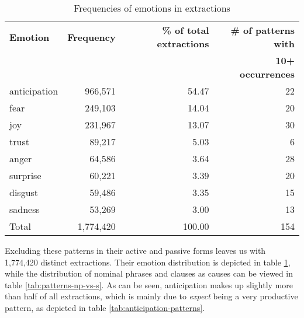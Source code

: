 \begin{table}[h]
\centering
\begin{tabular}{l|r|r|r}
{\bf Emotion} & {\bf Frequency} & {\bf\% of total extractions} & {\bf\# of patterns with}\\
              &                 &                              & {\bf 10+ occurrences}\\\hline
anticipation  & 966,571          & 54.47                       & 22 \\
fear          & 249,103          & 14.04                       & 20 \\
joy           & 231,967          & 13.07                       & 30 \\
trust         & 89,217           & 5.03                        &  6 \\
anger         & 64,586           & 3.64                        & 28 \\
surprise      & 60,221           & 3.39                        & 20 \\
disgust       & 59,486           & 3.35                        & 15 \\
sadness       & 53,269           & 3.00                        & 13\\\hline
Total         & 1,774,420         & 100.00                     & 154                
\end{tabular}
\caption{Frequencies of emotions in extractions}
\label{tab:extraction-emotion-freq}
\end{table}

Excluding these patterns in their active and passive forms leaves us with 1,774,420 distinct extractions. Their emotion distribution is depicted in table \ref{tab:extraction-emotion-freq}, while the distribution of nominal phrases and clauses as causes can be viewed in table \ref{tab:patterns-np-vs-s}. As can be seen, anticipation makes up slightly more than half of all extractions, which is mainly due to \textit{expect} being a very productive pattern, as depicted in table \ref{tab:anticipation-patterns}.


